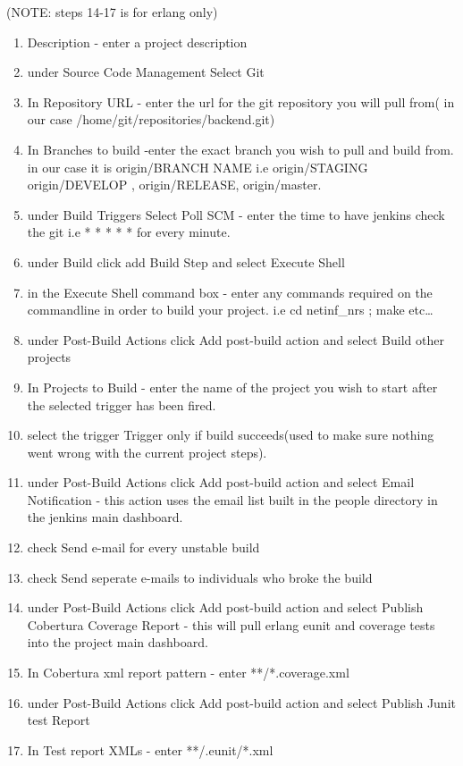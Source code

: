 (NOTE: steps 14-17 is for erlang only)

\begin{enumerate}
\item Description - enter a project description
\item under Source Code Management Select Git
\item In Repository URL - enter the url for the git repository you will pull from( in our case /home/git/repositories/backend.git)
\item In Branches to build -enter the exact branch you wish to pull and build from. in our case it is origin/BRANCH NAME i.e  origin/STAGING origin/DEVELOP , origin/RELEASE, origin/master. 
\item under Build Triggers Select Poll SCM - enter the time to have jenkins check the git i.e  * * * * * for every minute.
\item under Build click add Build Step and select Execute Shell
\item in the Execute Shell command box - enter any commands required on the commandline in order to build your project. i.e cd netinf\_nrs ; make  etc\ldots
\item under Post-Build Actions click Add post-build action and select Build other projects
\item In Projects to Build - enter the name of the project you wish to start after the selected trigger has been fired.
\item select the trigger Trigger only if build succeeds(used to make sure nothing went wrong with the current project steps).
\item under Post-Build Actions click Add post-build action  and select Email Notification - this action uses the email list built in the people directory in the jenkins main dashboard.
\item check Send e-mail for every unstable build 
\item check Send seperate e-mails to individuals who broke the build 
\item under Post-Build Actions click Add post-build action and select Publish Cobertura Coverage Report	- this will pull erlang eunit and coverage tests into the project main dashboard.
\item In Cobertura xml report pattern - enter  **/*.coverage.xml
\item under Post-Build Actions click Add post-build action and select Publish Junit test Report
\item In Test report XMLs - enter **/.eunit/*.xml

\end{enumerate}

